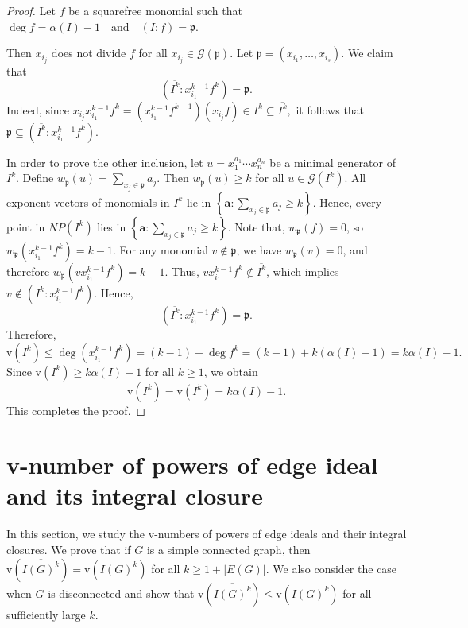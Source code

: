 \documentclass[11pt,reqno,a4paper]{amsart}
\theoremstyle{definition}
\begin{document}
\begin{proof}
Let \(f\) be a squarefree monomial such that
\(
\deg f = \alpha(I) - 1 \quad \text{and} \quad (I : f) = \mathfrak{p}.
\)

\noindent Then \(x_{i_j}\) does not divide \(f\) for all \(x_{i_j} \in \mathcal{G}(\mathfrak{p})\). Let \(\mathfrak{p} = (x_{i_1}, \ldots, x_{i_s})\).
\noindent We claim that
\[
(\overline{I^k} : x_{i_1}^{k-1} f^k) = \mathfrak{p}.
\]
Indeed, since
\(
x_{i_j} x_{i_1}^{k-1} f^k = (x_{i_1}^{k-1} f^{k-1})(x_{i_j} f) \in I^k \subseteq \overline{I^k},
\)
it follows that \(\mathfrak{p} \subseteq (\overline{I^k} : x_{i_1}^{k-1} f^k)\).

\noindent In order to prove the other inclusion, let \(u = x_1^{a_1} \cdots x_n^{a_n}\) be a minimal generator of \(I^k\). Define
\(
w_{\mathfrak{p}}(u) = {\sum_{x_j \in \mathfrak{p}}} a_j.
\)
Then \(w_{\mathfrak{p}}(u) \ge k\) for all \(u \in \mathcal{G}(I^k)\).
All exponent vectors of monomials in \(I^k\) lie in 
\(
\left\{ \mathbf{a} : \sum_{x_j \in \mathfrak{p}} a_j \ge k \right\}.
\)
Hence, every point in \(NP(I^k)\) lies in
\(
\left\{ \mathbf{a} : \sum_{x_j \in \mathfrak{p}} a_j \ge k \right\}.
\)
Note that, \(w_{\mathfrak{p}}(f) = 0\), so
\(
w_{\mathfrak{p}}(x_{i_1}^{k-1} f^k) = k - 1.
\)
For any monomial \(v \notin \mathfrak{p}\), we have \(w_{\mathfrak{p}}(v) = 0\), and therefore
\(
w_{\mathfrak{p}}(v x_{i_1}^{k-1} f^k) = k - 1.
\)
Thus, \(v x_{i_1}^{k-1} f^k \notin \overline{I^k}\), which implies
\(
v \notin (\overline{I^k} : x_{i_1}^{k-1} f^k).
\)
Hence,
\[
(\overline{I^k} : x_{i_1}^{k-1} f^k) = \mathfrak{p}.
\]
Therefore,
\[
\mathrm{v}(\overline{I^k}) \le \deg(x_{i_1}^{k-1} f^k) = (k-1) + \deg f^k = (k-1) + k(\alpha(I) - 1) = k\alpha(I) - 1.
\]
Since \(\mathrm{v}(I^k) \ge k\alpha(I) - 1\) for all \(k \ge 1\), we obtain
\[
\mathrm{v}(\overline{I^k}) = \mathrm{v}(I^k) = k\alpha(I) - 1.
\]
This completes the proof.
\end{proof}




\section{v-number of powers of edge ideal and its integral closure}


\noindent In this section, we study the $\mathrm{v}$-numbers of powers of edge ideals and their integral closures. We prove that if $G$ is a simple connected graph, then
\(
\mathrm{v}\!\left(\overline{I(G)^k}\right)
=
\mathrm{v}\!\left(I(G)^k\right)
\)
for all $k\geq 1+|E(G)|$. We also consider the case when $G$ is disconnected and show that
\(
\mathrm{v}\!\left(\overline{I(G)^k}\right)
\leq
\mathrm{v}\!\left(I(G)^k\right)
\)
for all sufficiently large $k$.\\
\end{document}
